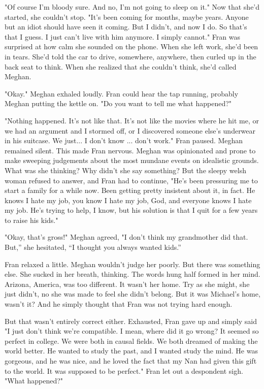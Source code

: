 \documentclass{article}
\begin{document}
"Of course I'm bloody sure. And no, I'm not going to sleep on it." Now that she'd started, she couldn't stop. "It's been coming for months, maybe years. Anyone but an idiot should have seen it coming. But I didn't, and now I do. So that's that I guess. I just can't live with him anymore. I simply cannot." Fran was surprised at how calm she sounded on the phone. When she left work, she'd been in tears. She'd told the car to drive, somewhere, anywhere, then curled up in the back seat to think. When she realized that she couldn't think, she'd called Meghan. 

"Okay." Meghan exhaled loudly. Fran could hear the tap running, probably Meghan putting the kettle on. "Do you want to tell me what happened?"

"Nothing happened. It’s not like that. It’s not like the movies where he hit me, or we had an argument and I stormed off, or I discovered someone else's underwear in his suitcase. We just... I don’t know ... don't work." Fran paused. Meghan remained silent. This made Fran nervous. Meghan was opinionated and prone to make sweeping judgements about the most mundane events on idealistic grounds. What was she thinking? Why didn’t she say something? But the sleepy welsh woman refused to answer, and Fran had to continue, "He's been pressuring me to start a family for a while now. Been getting pretty insistent about it, in fact. He knows I hate my job, you know I hate my job, God, and everyone knows I hate my job. He's trying to help, I know, but his solution is that I quit for a few years to raise his kids."

"Okay, that’s gross!" Meghan agreed, "I don't think my grandmother did that. But,” she hesitated, “I thought you always wanted kids.”

Fran relaxed a little. Meghan wouldn’t judge her poorly. But there was something else. She sucked in her breath, thinking. The words hung half formed in her mind. Arizona, America, was too different. It wasn’t her home. Try as she might, she just didn’t, no she was made to feel she didn’t belong. But it was Michael’s home, wasn’t it? And he simply thought that Fran was not trying hard enough. 

But that wasn’t entirely correct either. Exhausted, Fran gave up and simply said "I just don't think we're compatible. I mean, where did it go wrong? It seemed so perfect in college. We were both in causal fields. We both dreamed of making the world better. He wanted to study the past, and I wanted study the mind. He was gorgeous, and he was nice, and he loved the fact that my Nan had given this gift to the world. It was supposed to be perfect." Fran let out a despondent sigh. "What happened?"
\end{document}
